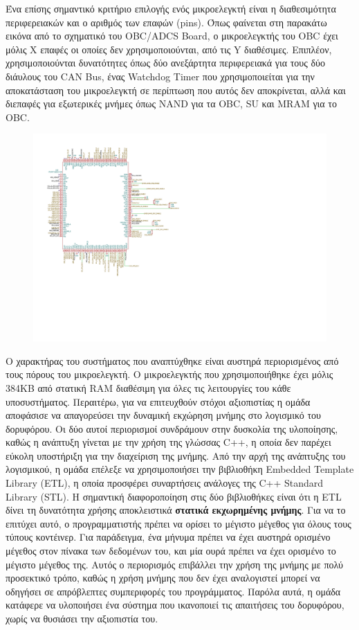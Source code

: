 \documentclass[a4paper,nobib,justified]{tufte-book}
\begin{document}
Ένα επίσης σημαντικό κριτήριο επιλογής ενός μικροελεγκτή είναι η διαθεσιμότητα περιφερειακών και ο αριθμός των επαφών (pins). Όπως φαίνεται στη παρακάτω εικόνα από το σχηματικό του OBC/ADCS Board, ο μικροελεγκτής του OBC έχει μόλις X επαφές οι οποίες δεν χρησιμοποιούνται, από τις Y διαθέσιμες. Επιπλέον, χρησιμοποιούνται δυνατότητες όπως δύο ανεξάρτητα περιφερειακά για τους δύο διάυλους του CAN Bus, ένας Watchdog Timer που χρησιμοποιείται για την αποκατάσταση του μικροελεγκτή σε περίπτωση που αυτός δεν αποκρίνεται, αλλά και διεπαφές για εξωτερικές μνήμες όπως NAND για τα OBC, SU και MRAM για το OBC.  %
\begin{figure}[h]
	\includegraphics{media/diagrams/obc-mcu-schematic.pdf}
\end{figure}

Ο χαρακτήρας του συστήματος που αναπτύχθηκε είναι αυστηρά περιορισμένος από τους πόρους του μικροελεγκτή. Ο μικροελεγκτής που χρησιμοποιήθηκε έχει μόλις 384KB από στατική RAM διαθέσιμη για όλες τις λειτουργίες του κάθε υποσυστήματος. Περαιτέρω, για να επιτευχθούν στόχοι αξιοπιστίας η ομάδα αποφάσισε να απαγορεύσει την δυναμική εκχώρηση μνήμης στο λογισμικό του δορυφόρου. Οι δύο αυτοί περιορισμοί συνδράμουν στην δυσκολία της υλοποίησης, καθώς η ανάπτυξη γίνεται με την χρήση της γλώσσας C++, η οποία δεν παρέχει εύκολη υποστήριξη για την διαχείριση της μνήμης. Από την αρχή της ανάπτυξης του λογισμικού, η ομάδα επέλεξε να χρησιμοποιήσει την βιβλιοθήκη Embedded Template Library (ETL), η οποία προσφέρει συναρτήσεις ανάλογες της C++ Standard Library (STL). Η σημαντική διαφοροποίηση στις δύο βιβλιοθήκες είναι ότι η ETL δίνει τη δυνατότητα χρήσης αποκλειστικά \textbf{στατικά εκχωρημένης μνήμης}. Για να το επιτύχει αυτό, ο προγραμματιστής πρέπει να ορίσει το μέγιστο μέγεθος για όλους τους τύπους κοντέινερ. Για παράδειγμα, ένα μήνυμα πρέπει να έχει αυστηρά ορισμένο μέγεθος στον πίνακα των δεδομένων του, και μία ουρά πρέπει να έχει ορισμένο το μέγιστο μέγεθος της. Αυτός ο περιορισμός επιβάλλει την χρήση της μνήμης με πολύ προσεκτικό τρόπο, καθώς η χρήση μνήμης που δεν έχει αναλογιστεί μπορεί να οδηγήσει σε απρόβλεπτες συμπεριφορές του προγράμματος. Παρόλα αυτά, η ομάδα κατάφερε να υλοποιήσει ένα σύστημα που ικανοποιεί τις απαιτήσεις του δορυφόρου, χωρίς να θυσιάσει την αξιοπιστία του.
\end{document}
